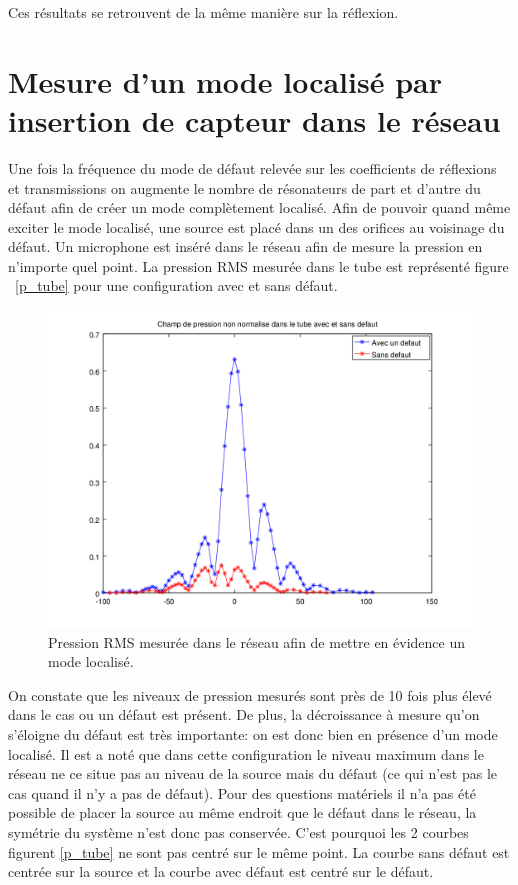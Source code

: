 Ces résultats se retrouvent de la même manière sur la réflexion.



\section{Mesure d'un mode localisé par insertion de capteur dans le réseau}



Une fois la fréquence du mode de défaut relevée sur les coefficients de réflexions et transmissions on augmente le nombre de résonateurs de part et d'autre du défaut afin de créer un mode complètement localisé. Afin de pouvoir quand même exciter le mode localisé, une source est placé dans un des orifices au voisinage du défaut. Un microphone est inséré dans le réseau afin de mesure la pression en n'importe quel point. La pression RMS mesurée dans le tube est représenté figure ~\ref{p_tube} pour une configuration avec et sans défaut.

\begin{figure}[!h]
\centering
\includegraphics[scale=0.5]{./images_chp3/non_norm_lin.png}
\caption{\label{_tube} Pression RMS mesurée dans le réseau afin de mettre en évidence un mode localisé.}
\end{figure}

On constate que les niveaux de pression mesurés sont près de 10 fois plus élevé dans le cas ou un défaut est présent. De plus, la décroissance à mesure qu'on s'éloigne du défaut est très importante: on est donc bien en présence d'un mode localisé. Il est a noté que dans cette configuration le niveau maximum dans le réseau ne ce situe pas au niveau de la source mais du défaut (ce qui n'est pas le cas quand il n'y a pas de défaut).
\bigskip
Pour des questions matériels il n'a pas été possible de placer la source au même endroit que le défaut dans le réseau, la symétrie du système n'est donc pas conservée. C'est pourquoi les 2 courbes figurent \ref{p_tube} ne sont pas centré sur le même point. La courbe sans défaut est centrée sur la source et la courbe avec défaut est centré sur le défaut. 

